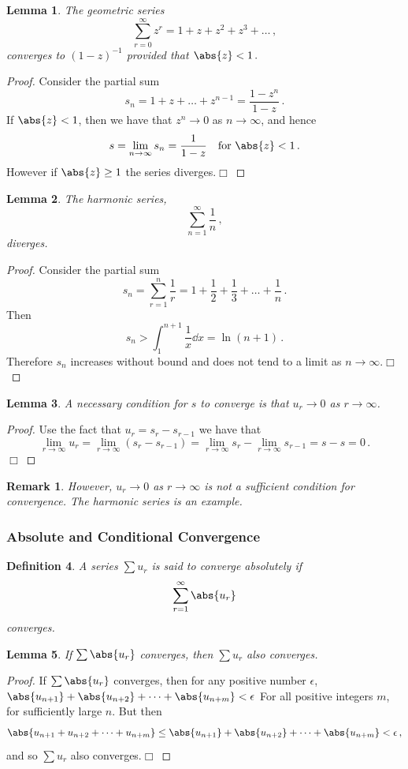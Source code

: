 \documentclass{article}
\theoremstyle{plain}\theoremheaderfont{\normalfont\itshape}\theorembodyfont{\rmfamily}\theoremseparator{.}\newtheorem*{rem}{Remark}\newtheorem*{ex}{Example}\newtheorem*{proof}{Proof}\newtheorem*{altp}{Alternative proof}
\theoremstyle{plain}\theoremheaderfont{\normalfont\bfseries}\theorembodyfont{\rmfamily}\theoremseparator{.}\newtheorem{thm}{Theorem}[section]\newtheorem{lem}[thm]{Lemma}\newtheorem{prop}[thm]{Proposition}\newtheorem*{cor}{Corollary}\newtheorem{defn}[thm]{Definition}\newtheorem{clm}[thm]{Claim}\newtheorem{clminproof}{Claim}
\theoremstyle{break}\theoremheaderfont{\normalfont\itshape}\theorembodyfont{\rmfamily}\theoremseparator{.\medskip}\newtheorem*{proofskip}{Proof}\newtheorem*{exs}{Examples}\newtheorem*{rems}{Remarks}
\theoremstyle{break}\theoremheaderfont{\normalfont\bfseries}\theorembodyfont{\rmfamily}\theoremseparator{.\medskip}\newtheorem{lemskip}[thm]{Lemma}\newtheorem{defnskip}[thm]{Definition}\newtheorem{propskip}[thm]{Proposition}\newtheorem{thmskip}[thm]{Theorem}
\numberwithin{equation}{section}
\newcommand{\qed}{\hfill\ensuremath{\Box}}
\begin{document}
	\begin{lem} The geometric series
		\[\sum_{r=0}^{\infty}z^r=1+z+z^2+z^3+\dots\,,\]
		converges to \((1-z)^{-1}\) provided that \(\abs{z}<1\,.\)
	\end{lem}
	\begin{proof}
		Consider the partial sum
		\[s_n=1+z+\dots+z^{n-1}=\frac{1-z^n}{1-z}\,.\]
		If \(\abs{z}<1\), then we have that \(z^n\to 0\) as \(n\to\infty\), and hence
		\[s=\lim_{n\to\infty}s_n=\frac{1}{1-z}\quad\text{for }\abs{z}<1\,.\]
		However if \(\abs{z}\ge 1\) the series diverges.\qed
	\end{proof}
	\begin{lem}
		The harmonic series,
		\[\sum_{n=1}^{\infty}\frac{1}{n}\,,\]
		diverges.
	\end{lem}
	\begin{proof}
		Consider the partial sum
		\[s_n=\sum_{r=1}^{n}\frac{1}{r}=1+\frac{1}{2}+\frac{1}{3}+\dots+\frac{1}{n}\,.\]
		Then
		\[s_n>\int_{1}^{n+1}\frac{1}{x}\dd{x}=\ln(n+1)\,.\]
		Therefore \(s_n\) increases without bound and does not tend to a limit as \(n\to\infty\).\qed
	\end{proof}
	\begin{lem}
		A necessary condition for \(s\) to converge is that \(u_r\to 0\) as \(r\to\infty\).
	\end{lem}
	\begin{proof}
		Use the fact that \(u_r=s_r-s_{r-1}\) we have that
		\[\lim_{r\to\infty}u_r=\lim_{r\to\infty}(s_r-s_{r-1})=\lim_{r\to\infty}s_r-\lim_{r\to\infty}s_{r-1}=s-s=0\,.\]
		\qed
	\end{proof}
	\begin{rem}
		However, \(u_r\to 0\) as \(r\to\infty\) is not a sufficient condition for convergence. The harmonic series is an example.
	\end{rem}
	\subsubsection{Absolute and Conditional Convergence}
	\begin{defn}
		A series \(\sum u_r\) is said to \textit{converge absolutely} if
		\[\sum_{r=1}^{\infty}\abs{u_r}\]
		converges.
	\end{defn}
	\begin{lem}
		If \(\sum\abs{u_r}\) converges, then \(\sum u_r\) also converges.
	\end{lem}
	\begin{proof}
		If \(\sum\abs{u_r}\) converges, then for any positive number \(\epsilon\),
		\(\abs{u_{n+1}}+\abs{u_{n+2}}+\dots+\abs{u_{n+m}}<\epsilon\)
		For all positive integers \(m\), for sufficiently large \(n\). But then
		\[\abs{u_{n+1}+u_{n+2}+\dots+u_{n+m}}\le\abs{u_{n+1}}+\abs{u_{n+2}}+\dots+\abs{u_{n+m}}<\epsilon\,,\]
		and so \(\sum u_r\) also converges.\qed
	\end{proof}
\end{document}
